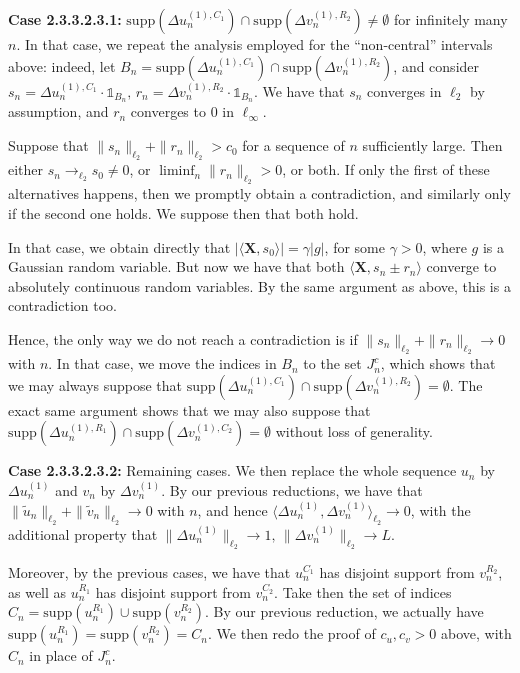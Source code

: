 \documentclass[a4paper,12pt]{amsart}
\numberwithin{equation}{section}
\newcommand{\X}{\mathbf X}
\begin{document}
\vspace{2mm}

\noindent\textbf{Case 2.3.3.2.3.1:} $\text{supp}(\Delta u_n^{(1),C_1}) \cap \text{supp}(\Delta v_n^{(1),R_2}) \neq \emptyset$ for infinitely many $n$. In that case, we repeat the analysis employed for the ``non-central'' intervals above: indeed, let $B_n = \text{supp}(\Delta u_n^{(1),C_1}) \cap \text{supp}(\Delta v_n^{(1),R_2})$, and consider $s_n = \Delta u_n^{(1),C_1} \cdot \mathds{1}_{B_n}, \, r_n = \Delta v_n^{(1),R_2} \cdot \mathds{1}_{B_n}$. We have that $s_n$ converges in $\ell_2$ by assumption, and $r_n$ converges to $0$ in $\ell_{\infty}$. 

Suppose that $\|s_n\|_{\ell_2} + \|r_n\|_{\ell_2} > c_0$ for a sequence of $n$ sufficiently large. Then either $s_n \to_{\ell_2} s_0 \neq 0$, or $\liminf_n \|r_n\|_{\ell_2} > 0$, or both. If only the first of these alternatives happens, then we promptly obtain a contradiction, and similarly only if the second one holds. We suppose then that both hold. 

In that case, we obtain directly that $|\langle \X, s_0 \rangle| = \gamma |g|$, for some $\gamma > 0$, where $g$ is a Gaussian random variable. But now we have that both $\langle \X, s_n \pm r_n\rangle$ converge to absolutely continuous random variables. By the same argument as above, this is a contradiction too. 

Hence, the only way we do not reach a contradiction is if $\|s_n\|_{\ell_2} + \|r_n\|_{\ell_2} \to 0$ with $n$. In that case, we move the indices in $B_n$ to the set $J_n^c$, which shows that we may always suppose that $\text{supp}(\Delta u_n^{(1),C_1}) \cap \text{supp}(\Delta v_n^{(1),R_2}) = \emptyset$. The exact same argument shows that we may also suppose that $\text{supp}(\Delta u_n^{(1),R_1}) \cap \text{supp}(\Delta v_n^{(1),C_2}) = \emptyset$ without loss of generality. \\

\vspace{2mm}

\noindent\textbf{Case 2.3.3.2.3.2:} Remaining cases. We then replace the whole sequence $u_n$ by $\Delta u_n^{(1)}$ and $v_n$ by $\Delta v_n^{(1)}$. By our previous reductions, we have that $\|\tilde{u}_n\|_{\ell_2} + \|\tilde{v}_n\|_{\ell_2} \to 0$ with $n$, and hence $\langle \Delta u_n^{(1)}, \Delta v_n^{(1)} \rangle_{\ell_2} \to 0$, with the additional property that $\|\Delta u_n^{(1)}\|_{\ell_2} \to 1, \, \|\Delta v_n^{(1)}\|_{\ell_2} \to L$. 

Moreover, by the previous cases, we have that $u_n^{C_1}$ has disjoint support from $v_n^{R_2}$, as well as $u_n^{R_1}$ has disjoint support from $v_n^{C_2}$. Take then the set of indices $C_n = \text{supp}(u_n^{R_1}) \cup \text{supp}(v_n^{R_2})$. By our previous reduction, we actually have $\text{supp}(u_n^{R_1}) = \text{supp}(v_n^{R_2}) = C_n$. We then redo the proof of $c_u,c_v>0$ above, with $C_n$ in place of $J_n^c$. 
\end{document}
